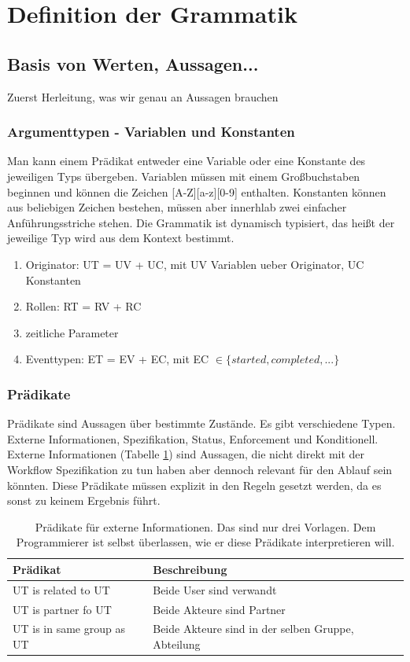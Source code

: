 %
%
\section{Definition der Grammatik}
\subsection{Basis von Werten, Aussagen...}
Zuerst Herleitung, was wir genau an Aussagen brauchen\\
\subsubsection{Argumenttypen - Variablen und Konstanten}

Man kann einem Prädikat entweder eine Variable oder eine Konstante des jeweiligen Typs übergeben. Variablen müssen mit einem Großbuchstaben beginnen und können die Zeichen [A-Z][a-z][0-9] enthalten. Konstanten können aus beliebigen Zeichen bestehen, müssen aber innerhlab zwei einfacher Anführungsstriche stehen. Die Grammatik ist dynamisch typisiert, das heißt der jeweilige Typ wird aus dem Kontext bestimmt.

\begin{enumerate}
\item Originator: UT = UV + UC, mit UV Variablen ueber Originator, UC Konstanten
\item Rollen: RT = RV + RC
\item zeitliche Parameter
\item Eventtypen: ET = EV + EC, mit EC $\in\{started, completed,...\}$
\end{enumerate}

\subsubsection{Prädikate}
Prädikate sind Aussagen über bestimmte Zustände. Es gibt verschiedene Typen. Externe Informationen, Spezifikation, Status, Enforcement und Konditionell. \\

Externe Informationen (Tabelle \ref{tab:extern}) sind Aussagen, die nicht direkt mit der Workflow Spezifikation zu tun haben aber dennoch relevant für den Ablauf sein könnten. Diese Prädikate müssen explizit in den Regeln gesetzt werden, da es sonst zu keinem Ergebnis führt.
\begin{table}[h]
\begin{tabular} {|p{6cm}|p{10cm}|}
\hline
\textbf{Prädikat} & \textbf{Beschreibung}\\
\hline
UT is related to UT 		& Beide User sind verwandt \\
\hline
UT is partner fo UT		& Beide Akteure sind Partner \\
\hline
UT is in same group as UT	& Beide Akteure sind in der selben Gruppe, Abteilung\\
\hline
\end{tabular}
\caption{Prädikate für externe Informationen. Das sind nur drei Vorlagen. Dem Programmierer ist selbst überlassen, wie er diese Prädikate interpretieren will.}
\label{tab:extern}
\end{table}

